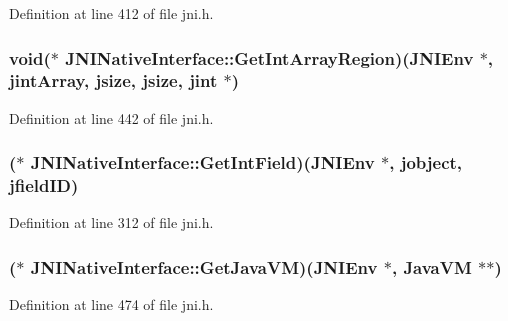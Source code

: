 Definition at line 412 of file jni.\-h.

\hypertarget{struct_j_n_i_native_interface_a39b4ab00d2953b3a43637d94f82c13d8}{
\subsubsection[{Get\-Int\-Array\-Region}]{\setlength{\rightskip}{0pt plus 5cm}void($\ast$ J\-N\-I\-Native\-Interface\-::\-Get\-Int\-Array\-Region)({\bf J\-N\-I\-Env} $\ast$, {\bf jint\-Array}, {\bf jsize}, {\bf jsize}, {\bf jint} $\ast$)}}\label{struct_j_n_i_native_interface_a39b4ab00d2953b3a43637d94f82c13d8}


Definition at line 442 of file jni.\-h.

\hypertarget{struct_j_n_i_native_interface_a1abc6886334455061150d63a1b93f6a7}{
\subsubsection[{Get\-Int\-Field}]{($\ast$ J\-N\-I\-Native\-Interface\-::\-Get\-Int\-Field)({\bf J\-N\-I\-Env} $\ast$, {\bf jobject}, {\bf jfield\-I\-D})}}\label{struct_j_n_i_native_interface_a1abc6886334455061150d63a1b93f6a7}


Definition at line 312 of file jni.\-h.

\hypertarget{struct_j_n_i_native_interface_a81539f3f15f2999d1d2c0b2dd7d5397f}{
\subsubsection[{Get\-Java\-V\-M}]{($\ast$ J\-N\-I\-Native\-Interface\-::\-Get\-Java\-V\-M)({\bf J\-N\-I\-Env} $\ast$, {\bf Java\-V\-M} $\ast$$\ast$)}}\label{struct_j_n_i_native_interface_a81539f3f15f2999d1d2c0b2dd7d5397f}


Definition at line 474 of file jni.\-h.

